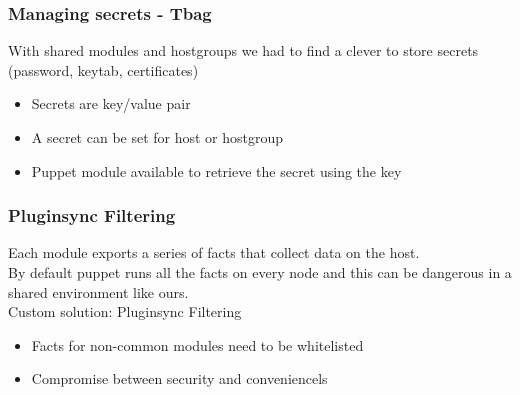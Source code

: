 \documentclass[aspectratio=169]{beamer}
\begin{document}

\begin{frame}
    \frametitle{Managing secrets - Tbag}
    With shared modules and hostgroups we had to find a clever to store
    secrets (password, keytab, certificates) \\[1em]

    \begin{itemize}
        \item Secrets are key/value pair
            \item A secret can be set for host or hostgroup
            \item Puppet module available to retrieve the secret using the key
    \end{itemize}
\end{frame}


\begin{frame}
    \frametitle{Pluginsync Filtering}
    Each module exports a series of facts that collect data on the host. \\
    By default puppet runs all the facts on every node and this can be dangerous
    in a shared environment like ours. \\[2em]
    Custom solution: Pluginsync Filtering

    \begin{itemize}
        \item Facts for non-common modules need to be whitelisted
        \item Compromise between security and conveniencels
    \end{itemize}
\end{frame}

\end{document}
